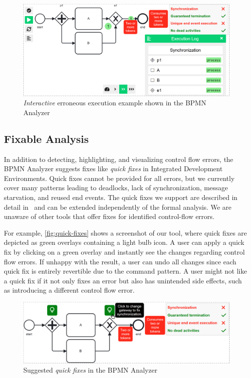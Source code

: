 \documentclass[
onecolumn, %
]{ceurart}
\begin{document}
\begin{figure}[ht]
	\centering
	\includegraphics[width=0.6\linewidth]{images/counter-example}
	\caption{\textit{Interactive} erroneous execution example shown in the BPMN Analyzer}
	\label{fig:counterexample}
\end{figure}

\subsection{Fixable Analysis}
In addition to detecting, highlighting, and visualizing control flow errors, the BPMN Analyzer suggests fixes like \textit{quick fixes} in Integrated Development Environments.
Quick fixes cannot be provided for all errors, but we currently cover many patterns leading to deadlocks, lack of synchronization, message starvation, and reused end events.
The quick fixes we support are described in detail in~\cite{krauterInstantaneousComprehensibleFixable2024} and can be extended independently of the formal analysis.
We are unaware of other tools that offer fixes for identified control-flow errors.

For example, \autoref{fig:quick-fixes} shows a screenshot of our tool, where quick fixes are depicted as green overlays containing a light bulb icon.
A user can apply a quick fix by clicking on a green overlay and instantly see the changes regarding control flow errors.
If unhappy with the result, a user can undo all changes since each quick fix is entirely revertible due to the command pattern.
A user might not like a quick fix if it not only fixes an error but also has unintended side effects, such as introducing a different control flow error.

\begin{figure}[ht]
	\centering
	\includegraphics[width=0.6\linewidth]{images/quick-fix}
	\caption{Suggested \textit{quick fixes} in the BPMN Analyzer}
	\label{fig:quick-fixes}
\end{figure}
\end{document}
